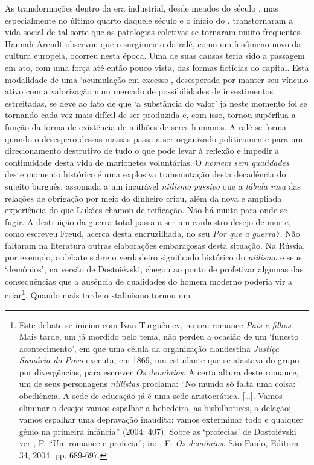 As transformações dentro da era industrial, desde meados do século ,
mas especialmente no último quarto daquele século e o início do ,
transtornaram a vida social de tal sorte que as patologias coletivas se
tornaram muito frequentes. Hannah Arendt observou que o surgimento da
ralé, como um fenômeno novo da cultura europeia, ocorreu nesta época.
Uma de suas causas teria sido a passagem em ato, com uma força até então
pouco vista, das formas fictícias do capital. Esta modalidade de uma
`acumulação em excesso', desesperada por manter seu vínculo ativo com a
valorização num mercado de possibilidades de investimentos estreitadas,
se deve ao fato de que `a substância do valor' já neste momento foi se
tornando cada vez mais difícil de ser produzida e, com isso, tornou
supérflua a função da forma de existência de milhões de seres humanos. A
ralé se forma quando o desespero dessas massas passa a ser organizado
politicamente para um direcionamento destrutivo de tudo o que pode levar
à reflexão e impedir a continuidade desta vida de marionetes
voluntárias. O \emph{homem sem qualidades} deste momento histórico é uma
explosiva transmutação desta decadência do sujeito burguês, assomada a
um incurável \emph{niilismo passivo} que a \emph{tábula rasa} das
relações de obrigação por meio do dinheiro criou, além da nova e
ampliada experiência do que Lukács chamou de reificação. Não há muito
para onde se fugir. A destruição da guerra total passa a ser um
canhestro desejo de morte, como escreveu Freud, acerca desta
encruzilhada, no seu \emph{Por que a guerra?.} Não faltaram na
literatura outras elaborações embaraçosas desta situação. Na Rússia, por
exemplo, o debate sobre o verdadeiro significado histórico do
\emph{niilismo} e seus `demônios', na versão de Dostoiévski, chegou ao
ponto de profetizar algumas das consequências que a ausência de
qualidades do homem moderno poderia vir a criar\footnote{Este debate se
  iniciou com Ivan Turguêniev, no seu romance \emph{Pais e filhos}. Mais
  tarde, um  já mordido pelo tema, não perdeu a ocasião de um
  `funesto acontecimento', em que uma célula da organização clandestina
  \emph{Justiça Sumária do Povo} executa, em 1869, um estudante que se
  afastava do grupo por divergências, para escrever \emph{Os demônios}.
  A certa altura deste romance, um de seus personagens \emph{niilistas}
  proclama: ``No mundo só falta uma coisa: obediência. A sede de
  educação já é uma sede aristocrática. [\ldots{}]. Vamos eliminar o
  desejo: vamos espalhar a bebedeira, as bisbilhotices, a delação; vamos
  espalhar uma depravação inaudita; vamos exterminar todo e qualquer
  gênio na primeira infância'' (2004: 407). Sobre as `profecias' de
  Dostoiévski ver , P. ``Um romance e profecia''; in:
  , F. \emph{\emph{Os demônios}.} São Paulo, Editora 34,
  2004, pp. 689-697.}. Quando mais tarde o stalinismo tornou um
